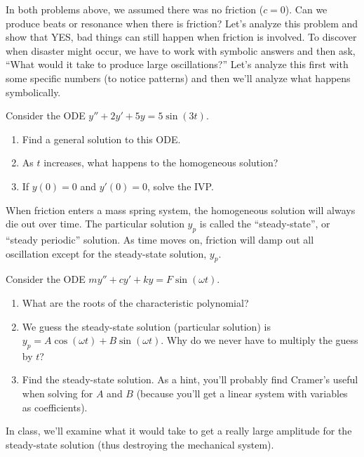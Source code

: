 In both problems above, we assumed there was no friction ($c=0$).  Can we produce beats or resonance when there is friction? Let's analyze this problem and show that YES, bad things can still happen when friction is involved. To discover when disaster might occur, we have to work with symbolic answers and then ask, ``What would it take to produce large oscillations?''  Let's analyze this first with some specific numbers (to notice patterns) and then we'll analyze what happens symbolically.
\begin{problem}
Consider the ODE $y''+2y'+5y=5\sin(3 t)$.
\begin{enumerate}
 \item Find a general solution to this ODE.  
 \item As $t$ increases, what happens to the homogeneous solution?
 \item If $y(0)=0$ and $y'(0)=0$, solve the IVP.
\end{enumerate}
\end{problem}

When friction enters a mass spring system, the homogeneous solution will always die out over time. The particular solution $y_p$ is called the ``steady-state'', or ``steady periodic'' solution. As time moves on, friction will damp out all oscillation except for the steady-state solution, $y_p$.  

\begin{problem}
Consider the ODE $my''+cy'+ky=F\sin(\omega t)$.
\begin{enumerate}
 \item What are the roots of the characteristic polynomial?
 \item We guess the steady-state solution (particular solution) is $y_p=A\cos(\omega t)+B\sin(\omega t)$.  Why do we never have to multiply the guess by $t$?
 \item Find the steady-state solution. As a hint, you'll probably find Cramer's useful when solving for $A$ and $B$ (because you'll get a linear system with variables as coefficients). 
\end{enumerate}
 In class, we'll examine what it would take to get a really large amplitude for the steady-state solution (thus destroying the mechanical system).
\end{problem}
  

